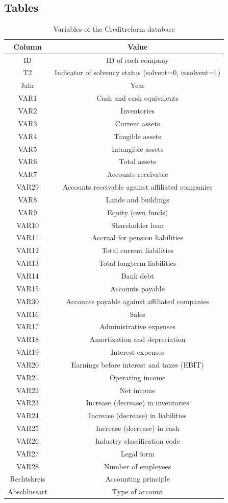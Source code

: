 \documentclass{article}
\begin{document}
\subsection{Tables}
\begin{center}
\begin{table}[h]
\caption{Variables of the Creditreform database}
\label{creditVars}
\begin{tabular}{cc} 
\hline\hline
Column & Value\\
\hline
ID & ID of each company\\
T2 & Indicator of solvency status (solvent=0, insolvent=1)\\
Jahr & Year\\
VAR1 & Cash and cash equivalents\\
VAR2 & Inventories\\
VAR3 & Current assets\\
VAR4 & Tangible assets\\
VAR5 & Intangible assets\\
VAR6 & Total assets\\
VAR7 & Accounts receivable\\
VAR29 & Accounts receivable against affiliated companies\\
VAR8 & Lands and buildings\\
VAR9 & Equity (own funds)\\
VAR10 & Shareholder loan\\
VAR11 & Accrual for pension liabilities\\
VAR12 & Total current liabilities\\
VAR13 & Total longterm liabilities\\
VAR14 & Bank debt\\
VAR15 & Accounts payable\\
VAR30 & Accounts payable against affiliated companies\\
VAR16 & Sales\\
VAR17 & Administrative expenses\\
VAR18 & Amortization and depreciation\\
VAR19 & Interest expenses\\
VAR20 & Earnings before interest and taxes (EBIT)\\
VAR21 & Operating income\\
VAR22 & Net income\\
VAR23 & Increase (decrease) in inventories\\
VAR24 & Increase (decrease) in liabilities\\
VAR25 & Increase (decrease) in cash\\
VAR26 & Industry classification code\\
VAR27 & Legal form\\
VAR28 & Number of employees\\
Rechtskreis & Accounting principle\\
Abschlussart & Type of account\\
\hline\hline
\end{tabular}
\end{table}
\end{center}
\end{document}
